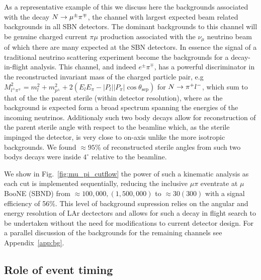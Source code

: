 \documentclass[11pt, a4paper]{article}
\newcommand{\reffig}[1]{Fig.~\ref{#1}}
\newcommand{\refapp}[1]{Appendix~\ref{#1}}
\def\ster{\ensuremath N}
\begin{document}
As a representative example of this we discuss here the backgrounds associated
with the decay $\ster \rightarrow \mu^\pm \pi^\mp$, the channel with largest
expected beam related backgrounds in all SBN detectors. The dominant
backgrounds to this channel will be genuine charged current $\pi \mu$
production associated with the $\nu_\mu$ neutrino beam of which there are many
expected at the SBN detectors. In essence the signal of a traditional neutrino
scattering experiment become the backgrounds for a decay-in-flight analysis.
This channel, and indeed $e^\pm \pi^\mp$, has a powerful discriminator in the
reconstructed invariant mass of the charged particle pair, e.g  $M_{l^\pm
\pi^\mp}^2=m_l^2+m_{p^\pm}^2+ 2(E_l E_\pi - |P_l||P_\pi|\cos\theta_\text{sep})$
for $\ster\rightarrow \pi^+ l^-$, which sum to that of the the parent sterile
(within detector resolution), where as the background is expected form a broad
spectrum spanning the energies of the incoming neutrinos. Additionaly such two
body decays allow for reconstruction of the parent sterile angle with respect
to the beamline which, as the sterile impinged the detector, is very close to
on-axis unlike the more isotropic backgrounds. We found $\approx 95$\% of
reconstructed sterile angles from such two bodys decays were inside $4^\circ$
relative to the beamline. 

We show in \reffig{fig:mu_pi_cutflow} the power of such a kinematic analysis as
each cut is implemented sequentially, reducing the inclusive $\mu \pi$
eventrate at $\mu$BooNE (SBND) from $\approx 100,000,(1,500,000)$ to $\approx
30 (300)$ with a signal efficiency of 56\%. This level of background supression
relies on the angular and energy resolution of LAr dectectors and allows for
such a decay in flight search to be undertaken without the need for
modifications to current detector design.  For a parallel discussion of the
backgrounds for the remaining channels see \refapp{app:bg}.

\subsection{\label{sec:timing}Role of event timing}
\end{document}
